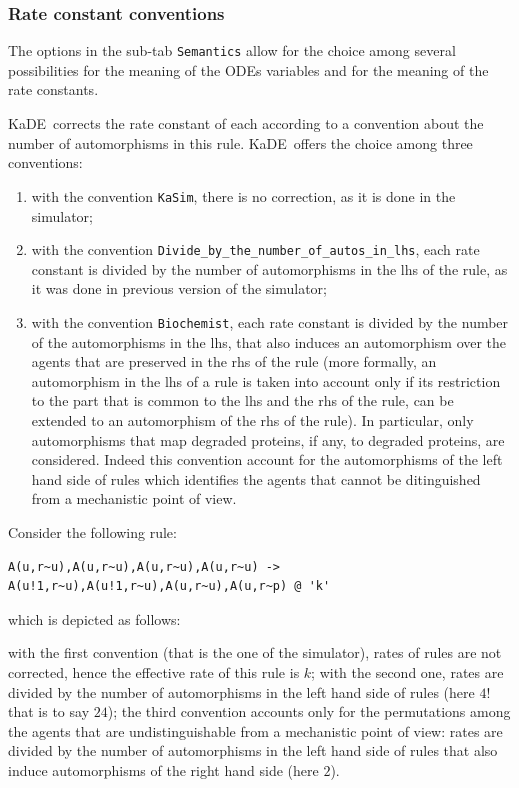 \documentclass[11pt]{book}
\def\KaDE{\textsf{KaDE}}
\begin{document}
\subsubsection{Rate constant conventions}





The options in the sub-tab \texttt{Semantics} allow for the choice among several possibilities for the meaning of the ODEs variables and for the meaning of the rate constants.


 \KaDE~corrects the rate constant of each  according to a convention about the number of automorphisms in this rule. {\KaDE}~offers the choice among three conventions:
\begin{enumerate}
  \item with the convention \texttt{KaSim}, there is no correction, as it is done in the simulator;
  \item with the convention \texttt{Divide\_by\_the\_number\_of\_autos\_in\_lhs}, each rate constant is divided by the number of automorphisms in the lhs of the rule, as it was done in previous version of the simulator;
  \item  with the convention \texttt{Biochemist}, each rate constant is divided
  by the number of the automorphisms in the lhs, that also induces an automorphism over the agents that are preserved in the rhs of the rule (more formally, an automorphism in the lhs of a rule is taken into account only if its restriction to the part that is common to the lhs and the rhs of the rule, can be extended to an automorphism of the rhs of the rule). In particular, only automorphisms that  map degraded proteins, if any, to degraded proteins, are considered. Indeed this convention account for the automorphisms of the left hand side of rules which identifies the agents that cannot be ditinguished from a mechanistic point of view.
\end{enumerate}

  Consider the following rule:
    \begin{lstlisting}[language=kappa]
A(u,r~u),A(u,r~u),A(u,r~u),A(u,r~u) -> A(u!1,r~u),A(u!1,r~u),A(u,r~u),A(u,r~p) @ 'k'
    \end{lstlisting}
which is depicted as follows:
\begin{center}
\end{center}

  with the first convention (that is the one of the simulator), rates of rules are not corrected, hence the effective rate of this rule is $k$;
  with the second one, rates are divided by the number of automorphisms in the left hand side of rules (here $4!$ that is to say $24$); the third convention accounts only for the permutations among the agents that are undistinguishable from a mechanistic point of view: rates are divided by the number of automorphisms in the left hand side of rules that also induce automorphisms of the right hand side  (here $2$).
\end{document}
